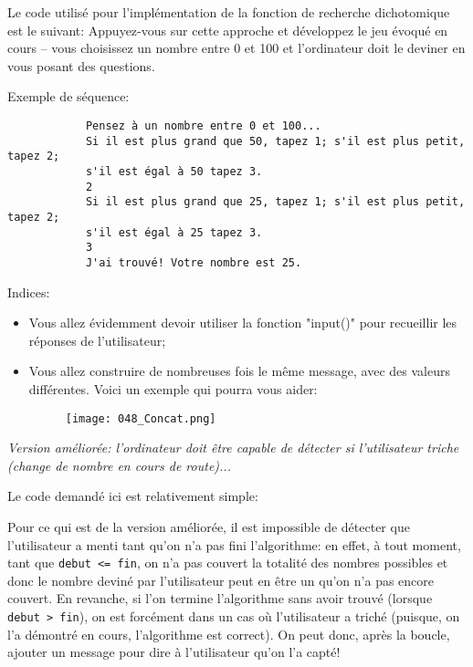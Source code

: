\documentclass[12pt]{article}
\begin{document}
	\begin{MonExo}
		Le code utilisé pour l'implémentation de la fonction de recherche dichotomique est le suivant:
		Appuyez-vous sur cette approche et développez le jeu évoqué en cours -- vous choisissez un nombre entre 0 et 100 et l'ordinateur doit le deviner en vous posant des questions.
		
		\vspace{\baselineskip}
		Exemple de séquence:
		\begin{verbatim}
			Pensez à un nombre entre 0 et 100...
			Si il est plus grand que 50, tapez 1; s'il est plus petit, tapez 2;
			s'il est égal à 50 tapez 3.
			2
			Si il est plus grand que 25, tapez 1; s'il est plus petit, tapez 2;
			s'il est égal à 25 tapez 3.
			3
			J'ai trouvé! Votre nombre est 25.
		\end{verbatim}
		
		\vspace{\baselineskip}
		Indices:
		\begin{itemize}
			\item Vous allez évidemment devoir utiliser la fonction "input()" pour recueillir les réponses de l'utilisateur;
			\item Vous allez construire de nombreuses fois le même message, avec des valeurs différentes. Voici un exemple qui pourra vous aider:
			\begin{figure}[H]
				\centering
				\texttt{[image: 048\_Concat.png]}
			\end{figure}
		\end{itemize}
		\vspace{\baselineskip}
		\textit{Version améliorée: l'ordinateur doit être capable de détecter si l'utilisateur triche (change de nombre en cours de route)...}
	\end{MonExo}
	\begin{MaReponse}
		Le code demandé ici est relativement simple:
		
		Pour ce qui est de la version améliorée, il est impossible de détecter que l'utilisateur a menti tant qu'on n'a pas fini l'algorithme: en effet, à tout moment, tant que \texttt{debut <= fin}, on n'a pas couvert la totalité des nombres possibles et donc le nombre deviné par l'utilisateur peut en être un qu'on n'a pas encore couvert. En revanche, si l'on termine l'algorithme sans avoir trouvé (lorsque \texttt{debut > fin}), on est forcément dans un cas où l'utilisateur a triché (puisque, on l'a démontré en cours, l'algorithme est correct). On peut donc, après la boucle, ajouter un message pour dire à l'utilisateur qu'on l'a capté!
	\end{MaReponse}
\end{document}
